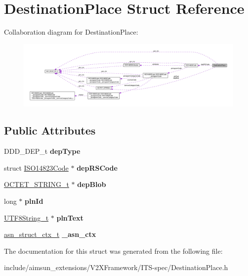 \hypertarget{structDestinationPlace}{}\section{Destination\+Place Struct Reference}
\label{structDestinationPlace}


Collaboration diagram for Destination\+Place\+:\nopagebreak
\begin{figure}[H]
\begin{center}
\leavevmode
\includegraphics[width=350pt]{structDestinationPlace__coll__graph}
\end{center}
\end{figure}
\subsection*{Public Attributes}
\begin{DoxyCompactItemize}
\item 
D\+D\+D\+\_\+\+D\+E\+P\+\_\+t {\bfseries dep\+Type}\hypertarget{structDestinationPlace_a531068b9127bad1a92b1192c8eb7967e}{}\label{structDestinationPlace_a531068b9127bad1a92b1192c8eb7967e}

\item 
struct \hyperlink{structISO14823Code}{I\+S\+O14823\+Code} $\ast$ {\bfseries dep\+R\+S\+Code}\hypertarget{structDestinationPlace_a6a3ada1a36fec9081fa1f2fc5b3716a7}{}\label{structDestinationPlace_a6a3ada1a36fec9081fa1f2fc5b3716a7}

\item 
\hyperlink{structOCTET__STRING}{O\+C\+T\+E\+T\+\_\+\+S\+T\+R\+I\+N\+G\+\_\+t} $\ast$ {\bfseries dep\+Blob}\hypertarget{structDestinationPlace_a63fc5611f0e9a9b528e6278f6d333ae2}{}\label{structDestinationPlace_a63fc5611f0e9a9b528e6278f6d333ae2}

\item 
long $\ast$ {\bfseries pln\+Id}\hypertarget{structDestinationPlace_a3d519881436ff8f71065e146e67fe68f}{}\label{structDestinationPlace_a3d519881436ff8f71065e146e67fe68f}

\item 
\hyperlink{structOCTET__STRING}{U\+T\+F8\+String\+\_\+t} $\ast$ {\bfseries pln\+Text}\hypertarget{structDestinationPlace_aaa43abff4f873bd295a4cd7de9ef250c}{}\label{structDestinationPlace_aaa43abff4f873bd295a4cd7de9ef250c}

\item 
\hyperlink{structasn__struct__ctx__s}{asn\+\_\+struct\+\_\+ctx\+\_\+t} {\bfseries \+\_\+asn\+\_\+ctx}\hypertarget{structDestinationPlace_afca14a0b7c8a2091e4751fb8c9a94224}{}\label{structDestinationPlace_afca14a0b7c8a2091e4751fb8c9a94224}

\end{DoxyCompactItemize}


The documentation for this struct was generated from the following file\+:\begin{DoxyCompactItemize}
\item 
include/aimsun\+\_\+extensions/\+V2\+X\+Framework/\+I\+T\+S-\/spec/Destination\+Place.\+h\end{DoxyCompactItemize}
